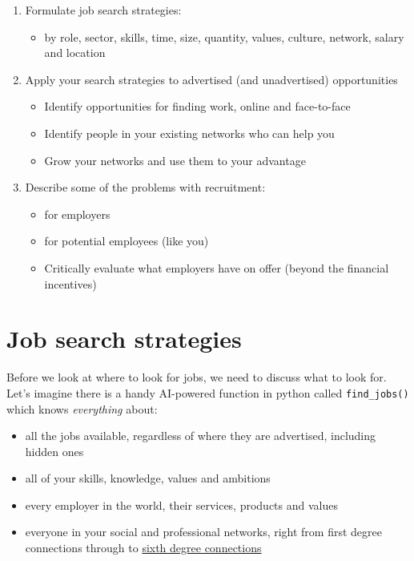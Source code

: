 \documentclass[
]{book}
\providecommand{\tightlist}{%
  \setlength{\itemsep}{0pt}\setlength{\parskip}{0pt}}
\begin{document}
\begin{enumerate}
\def\labelenumi{\arabic{enumi}.}
\tightlist
\item
  Formulate job search strategies:

  \begin{itemize}
  \tightlist
  \item
    by role, sector, skills, time, size, quantity, values, culture, network, salary and location
  \end{itemize}
\item
  Apply your search strategies to advertised (and unadvertised) opportunities

  \begin{itemize}
  \tightlist
  \item
    Identify opportunities for finding work, online and face-to-face
  \item
    Identify people in your existing networks who can help you
  \item
    Grow your networks and use them to your advantage
  \end{itemize}
\item
  Describe some of the problems with recruitment:

  \begin{itemize}
  \tightlist
  \item
    for employers
  \item
    for potential employees (like you)
  \item
    Critically evaluate what employers have on offer (beyond the financial incentives)
  \end{itemize}
\end{enumerate}

\hypertarget{strategies}{%
\section{Job search strategies}\label{strategies}}

Before we look at where to look for jobs, we need to discuss what to look for. Let's imagine there is a handy AI-powered function in python called \texttt{find\_jobs()} which knows \emph{everything} about:

\begin{itemize}
\tightlist
\item
  all the jobs available, regardless of where they are advertised, including hidden ones
\item
  all of your skills, knowledge, values and ambitions
\item
  every employer in the world, their services, products and values
\item
  everyone in your social and professional networks, right from first degree connections through to \href{https://en.wikipedia.org/wiki/Six_degrees_of_separation}{sixth degree connections} \citep{bacon}
\end{itemize}
\end{document}
